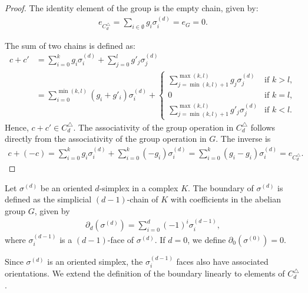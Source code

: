 \begin{proof}
	The identity element of the group is the empty chain, given by:
	\begin{align}
		e_{C^{\triangle}_d} = \sum_{i \in \emptyset} g_{i} \sigma_{i}^{(d)} = e_{G} = 0. 
	\end{align}
				
	The sum of two chains is defined as:
	\begin{align}
		c + c' &= \sum_{i=0}^{k} g_{i} \sigma_{i}^{(d)} + \sum_{j=0}^{l} g'_{j} \sigma_{j}^{(d)} \\
			   &= \sum_{i=0}^{\min(k, l)} (g_{i} + g'_{i}) \sigma_{i}^{(d)} + 
				\begin{cases}
				\sum_{j=\min(k, l)+1}^{\max(k, l)} g_{j} \sigma_{j}^{(d)}  & \text{if } k > l, \\
				0                                                          & \text{if } k = l, \\
				\sum_{j=\min(k, l)+1}^{\max(k, l)} g'_{j} \sigma_{j}^{(d)} & \text{if } k < l. 
				\end{cases}
	\end{align}
	Hence, \( c + c' \in C^{\triangle}_{d} \). The associativity of the group operation in \( C^{\triangle}_{d} \) follows directly from
	the associativity of the group operation in \( G \). The inverse is
	\begin{align}
		c + (-c) = \sum_{i=0}^{k} g_{i} \sigma_{i}^{(d)} + \sum_{i=0}^{k} (-g_{i}) \sigma_{i}^{(d)} = \sum_{i=0}^{k} (g_{i} - g_{i}) \sigma_{i}^{(d)} = e_{C^{\triangle}_d}. 
	\end{align}
\end{proof}

\begin{definition}[Boundary]{\cite[\S 2, p.106]{hatcher2005algebraic}} 
	Let \( \sigma^{(d)} \) be an oriented \( d \)-simplex in a complex \( K \). The boundary of \( \sigma^{(d)} \) is defined as the simplicial \( (d-1) \)-chain of \( K \) with coefficients in the abelian group \( G \), given by
	\begin{align}
		\partial_d(\sigma^{(d)}) = \sum_{i=0}^{d} (-1)^{i} \sigma^{(d-1)}_{i}, 
	\end{align}
	where \( \sigma^{(d-1)}_{i} \) is a \( (d-1) \)-face of \( \sigma^{(d)} \). If \( d = 0 \), we define \( \partial_0(\sigma^{(0)}) = 0 \).
\end{definition}

Since \( \sigma^{(d)} \) is an oriented simplex, the \( \sigma^{(d-1)}_{i} \) faces also have associated orientations. We extend the definition of the boundary linearly to elements of \( C^{\triangle}_{d} \).


